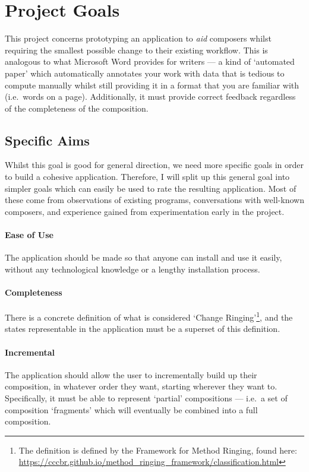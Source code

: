 \documentclass[12pt]{article}
\begin{document}
\pagebreak

\section{Project Goals}

This project concerns prototyping an application to \emph{aid} composers whilst requiring the
smallest possible change to their existing workflow.  This is analogous to what Microsoft Word
provides for writers --- a kind of `automated paper' which automatically annotates your work with
data that is tedious to compute manually whilst still providing it in a format that you are familiar
with (i.e.\ words on a page).  Additionally, it must provide correct feedback regardless of the
completeness of the composition.

\subsection{Specific Aims}

Whilst this goal is good for general direction, we need more specific goals in order to build a
cohesive application.  Therefore, I will split up this general goal into simpler goals which can
easily be used to rate the resulting application.  Most of these come from observations of existing
programs, conversations with well-known composers, and experience gained from experimentation early
in the project.

\paragraph{Ease of Use} The application should be made so that anyone can install and use it easily,
without any technological knowledge or a lengthy installation process.

\paragraph{Completeness} There is a concrete definition of what is considered `Change
Ringing'\footnote{The definition is defined by the Framework for Method Ringing, found here:
\url{https://cccbr.github.io/method_ringing_framework/classification.html}}, and the states
representable in the application must be a superset of this definition.

\paragraph{Incremental} The application should allow the user to incrementally build up their
composition, in whatever order they want, starting wherever they want to.  Specifically, it must
be able to represent `partial' compositions --- i.e.\ a set of composition `fragments' which will
eventually be combined into a full composition.
\end{document}
